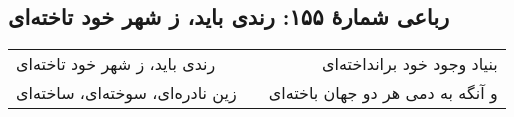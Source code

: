 \begin{center}
\section*{رباعی شمارهٔ ۱۵۵: رندی باید، ز شهر خود تاخته‌ای}
\label{sec:155}
\begin{longtable}{l p{0.5cm} r}
رندی باید، ز شهر خود تاخته‌ای
&&
بنیاد وجود خود برانداخته‌ای
\\
زین نادره‌ای، سوخته‌ای، ساخته‌ای
&&
و آنگه به دمی هر دو جهان باخته‌ای
\\
\end{longtable}
\end{center}
